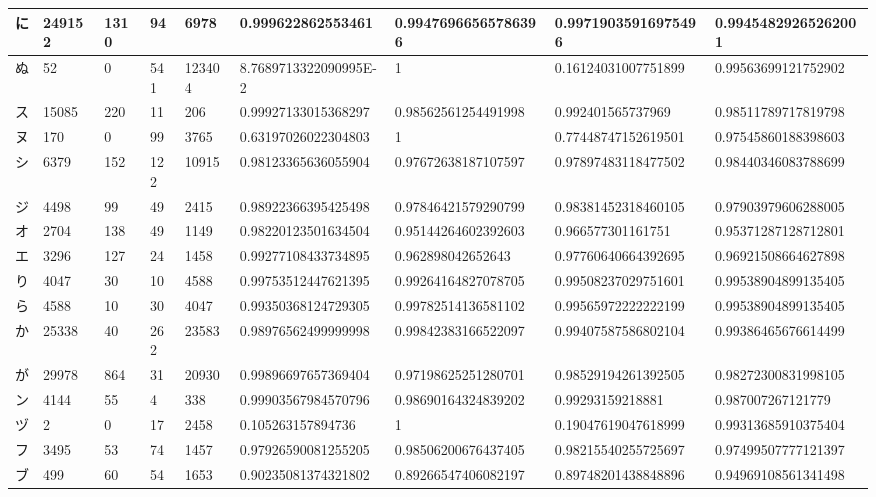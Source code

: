 \begin{table}[H]
\begin{center}
\begin{CJK}{UTF8}{min}
\begin{tabular}{ | l | l | l | l | l | l | l | l | l | }
			に & 249152 & 1310 & 94 & 6978 & 0.999622862553461 & 0.99476966565786396 & 0.99719035916975496 & 0.99454829265262001 \\ \hline
			ぬ & 52 & 0 & 541 & 123404 & 8.7689713322090995E-2 & 1 & 0.16124031007751899 & 0.99563699121752902 \\ \hline
			ス & 15085 & 220 & 11 & 206 & 0.99927133015368297 & 0.98562561254491998 & 0.992401565737969 & 0.98511789717819798 \\ \hline
			ヌ & 170 & 0 & 99 & 3765 & 0.63197026022304803 & 1 & 0.77448747152619501 & 0.97545860188398603 \\ \hline
			シ & 6379 & 152 & 122 & 10915 & 0.98123365636055904 & 0.97672638187107597 & 0.97897483118477502 & 0.98440346083788699 \\ \hline
			ジ & 4498 & 99 & 49 & 2415 & 0.98922366395425498 & 0.97846421579290799 & 0.98381452318460105 & 0.97903979606288005 \\ \hline
			オ & 2704 & 138 & 49 & 1149 & 0.98220123501634504 & 0.95144264602392603 & 0.966577301161751 & 0.95371287128712801 \\ \hline
			エ & 3296 & 127 & 24 & 1458 & 0.99277108433734895 & 0.962898042652643 & 0.97760640664392695 & 0.96921508664627898 \\ \hline
			り & 4047 & 30 & 10 & 4588 & 0.99753512447621395 & 0.99264164827078705 & 0.99508237029751601 & 0.99538904899135405 \\ \hline
			ら & 4588 & 10 & 30 & 4047 & 0.99350368124729305 & 0.99782514136581102 & 0.99565972222222199 & 0.99538904899135405 \\ \hline
			か & 25338 & 40 & 262 & 23583 & 0.98976562499999998 & 0.99842383166522097 & 0.99407587586802104 & 0.99386465676614499 \\ \hline
			が & 29978 & 864 & 31 & 20930 & 0.99896697657369404 & 0.97198625251280701 & 0.98529194261392505 & 0.98272300831998105 \\ \hline
			ン & 4144 & 55 & 4 & 338 & 0.99903567984570796 & 0.98690164324839202 & 0.99293159218881 & 0.987007267121779 \\ \hline
			ヅ & 2 & 0 & 17 & 2458 & 0.105263157894736 & 1 & 0.19047619047618999 & 0.99313685910375404 \\ \hline
			フ & 3495 & 53 & 74 & 1457 & 0.97926590081255205 & 0.98506200676437405 & 0.98215540255725697 & 0.97499507777121397 \\ \hline
			ブ & 499 & 60 & 54 & 1653 & 0.90235081374321802 & 0.89266547406082197 & 0.89748201438848896 & 0.94969108561341498 \\ \hline

\end{tabular}
\end{CJK}
\end{center}
\end{table}
